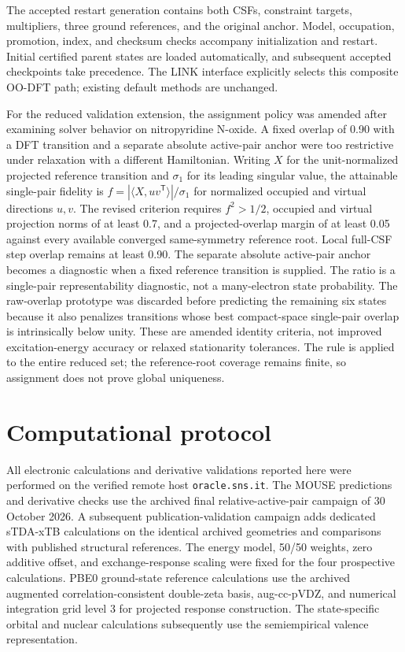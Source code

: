 \documentclass[11pt,a4paper]{article}
\begin{document}
The accepted restart generation contains both CSFs, constraint targets, multipliers, three ground references, and the original anchor. Model, occupation, promotion, index, and checksum checks accompany initialization and restart. Initial certified parent states are loaded automatically, and subsequent accepted checkpoints take precedence. The LINK interface explicitly selects this composite OO-DFT path; existing default methods are unchanged.

For the reduced validation extension, the assignment policy was amended after examining solver behavior on nitropyridine N-oxide. A fixed overlap of 0.90 with a DFT transition and a separate absolute active-pair anchor were too restrictive under relaxation with a different Hamiltonian. Writing $X$ for the unit-normalized projected reference transition and $\sigma_1$ for its leading singular value, the attainable single-pair fidelity is $f=|\langle X,u v^{\mathsf T}\rangle|/\sigma_1$ for normalized occupied and virtual directions $u,v$. The revised criterion requires $f^2>1/2$, occupied and virtual projection norms of at least 0.7, and a projected-overlap margin of at least 0.05 against every available converged same-symmetry reference root. Local full-CSF step overlap remains at least 0.90. The separate absolute active-pair anchor becomes a diagnostic when a fixed reference transition is supplied. The ratio is a single-pair representability diagnostic, not a many-electron state probability. The raw-overlap prototype was discarded before predicting the remaining six states because it also penalizes transitions whose best compact-space single-pair overlap is intrinsically below unity. These are amended identity criteria, not improved excitation-energy accuracy or relaxed stationarity tolerances. The rule is applied to the entire reduced set; the reference-root coverage remains finite, so assignment does not prove global uniqueness.

\section{Computational protocol}
All electronic calculations and derivative validations reported here were performed on the verified remote host \texttt{oracle.sns.it}. The MOUSE predictions and derivative checks use the archived final relative-active-pair campaign of 30 October 2026. A subsequent publication-validation campaign adds dedicated sTDA-xTB calculations on the identical archived geometries and comparisons with published structural references. The energy model, 50/50 weights, zero additive offset, and exchange-response scaling were fixed for the four prospective calculations. PBE0 ground-state reference calculations use the archived augmented correlation-consistent double-zeta basis, aug-cc-pVDZ, and numerical integration grid level 3 for projected response construction. The state-specific orbital and nuclear calculations subsequently use the semiempirical valence representation.
\end{document}
